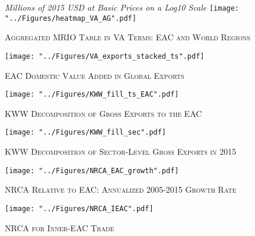 \documentclass[a4paper]{article}
\begin{document}
\begin{figure}[h!] \vspace{-10mm}
\centering
\caption{\label{fig:VAwld}\textsc{Aggregated MRIO Table in VA Terms: EAC and World Regions}}
\small{\textit{Millions of 2015 USD at Basic Prices on a Log10 Scale}}
\texttt{[image: "../Figures/heatmap\_VA\_AG".pdf]} %
\vspace{-8mm}
\end{figure}
\FloatBarrier

\begin{figure}[h!] 
\centering
\caption{\label{fig:VAexp}\textsc{EAC Domestic Value Added in Global Exports}}
\texttt{[image: "../Figures/VA\_exports\_stacked\_ts".pdf]} %
 \vspace{-10mm}
\end{figure}
\FloatBarrier

%

\begin{figure}[h!] 
\centering
\caption{\label{fig:KWW_fill_ts_EAC}\textsc{KWW Decomposition of Gross Exports to the EAC}}
\texttt{[image: "../Figures/KWW\_fill\_ts\_EAC".pdf]} %
\end{figure}
\FloatBarrier

\begin{figure}[h!] 
\centering
\caption{\label{fig:KWW_fill_sec}\textsc{KWW Decomposition of Sector-Level Gross Exports in 2015}}
\texttt{[image: "../Figures/KWW\_fill\_sec".pdf]} %
\end{figure}
\FloatBarrier

\begin{figure}[h!]
\centering
\caption{\label{fig:NRCA_EAC_growth}\textsc{NRCA Relative to EAC: Annualized 2005-2015 Growth Rate}}
\texttt{[image: "../Figures/NRCA\_EAC\_growth".pdf]} %
\end{figure}
\FloatBarrier


\begin{figure}[h!]
\centering
\caption{\label{fig:NRCA_IEAC}\textsc{NRCA for Inner-EAC Trade}}
\texttt{[image: "../Figures/NRCA\_IEAC".pdf]} %
\end{figure}
\FloatBarrier
\end{document}
